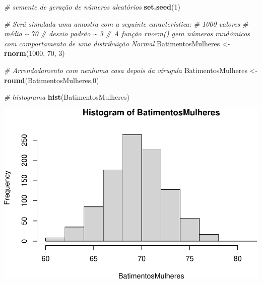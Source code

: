 \documentclass[
]{book}
\newenvironment{Shaded}{\begin{snugshade}}{\end{snugshade}}
\newcommand{\CommentTok}[1]{\textcolor[rgb]{0.56,0.35,0.01}{\textit{#1}}}
\newcommand{\DecValTok}[1]{\textcolor[rgb]{0.00,0.00,0.81}{#1}}
\newcommand{\FunctionTok}[1]{\textcolor[rgb]{0.13,0.29,0.53}{\textbf{#1}}}
\newcommand{\NormalTok}[1]{#1}
\newcommand{\OtherTok}[1]{\textcolor[rgb]{0.56,0.35,0.01}{#1}}
\newcommand{\SpecialCharTok}[1]{\textcolor[rgb]{0.81,0.36,0.00}{\textbf{#1}}}
\begin{document}
\begin{Shaded}
\begin{Highlighting}[]
\CommentTok{\# semente de geração de números aleatórios }
\FunctionTok{set.seed}\NormalTok{(}\DecValTok{1}\NormalTok{)}

\CommentTok{\# Será simulada uma amostra com a seguinte característica:}
\CommentTok{\# 1000 valores}
\CommentTok{\# média \textasciitilde{} 70}
\CommentTok{\# desvio padrão \textasciitilde{} 3}
\CommentTok{\# A função rnorm() gera números randômicos com comportamento de uma distribuição Normal }
\NormalTok{BatimentosMulheres }\OtherTok{\textless{}{-}} \FunctionTok{rnorm}\NormalTok{(}\DecValTok{1000}\NormalTok{, }\DecValTok{70}\NormalTok{, }\DecValTok{3}\NormalTok{)}

\CommentTok{\# Arrendodamento com nenhuma casa depois da vírugula}
\NormalTok{BatimentosMulheres }\OtherTok{\textless{}{-}} \FunctionTok{round}\NormalTok{(BatimentosMulheres,}\DecValTok{0}\NormalTok{)}

\CommentTok{\# histograma}
\FunctionTok{hist}\NormalTok{(BatimentosMulheres)}
\end{Highlighting}
\end{Shaded}

\includegraphics{Livro-Estatistica+R_files/figure-latex/unnamed-chunk-23-1.pdf}

\begin{Shaded}
\end{Shaded}
\end{document}
